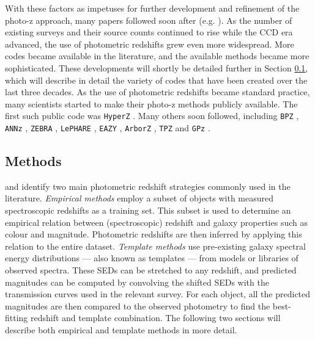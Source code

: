     
With these factors as impetuses for further development and refinement of the photo-z approach, many papers followed soon after (e.g. \citealt{1995AJ....110.2655C,1997ApJ...482L..21B,1998AJ....116.2081W,1996Natur.381..759L,1996ApJ...468L..77G,1996A&A...314...73P}). As the number of existing surveys and their source counts continued to rise while the CCD era advanced, the use of photometric redshifts grew even more widespread. More codes became available in the literature, and the available methods became more sophisticated. These developments will shortly be detailed further in Section \ref{subsection:methods}, which will describe in detail the variety of codes that have been created over the last three decades.  As the use of photometric redshifts became standard practice, many scientists started to make their photo-z methods publicly available. The first such public code was \texttt{HyperZ} \citep{2000A&A...363..476B}. Many others soon followed, including \texttt{BPZ} \citep{2000ApJ...536..571B},  \texttt{ANNz} \citep{2004PASP..116..345C},  \texttt{ZEBRA} \citep{2006MNRAS.372..565F},  \texttt{LePHARE} \citep{2006A&A...457..841I,2011ascl.soft08009A}, \texttt{EAZY} \citep{2008ApJ...686.1503B}, \texttt{ArborZ} \citep{2010ApJ...715..823G}, \texttt{TPZ} \citep{2013MNRAS.432.1483C,2010ApJ...712..511C} and \texttt{GPz} \citep{2016MNRAS.462..726A}. \par 


\subsection{Methods}\label{subsection:methods}
\cite{2011Ap&SS.331....1W} and \cite{1998astro.ph..9347Y} identify two main photometric redshift strategies commonly used in the literature. \textit{Empirical methods} employ a subset of objects with measured spectroscopic redshifts as a training set. This subset is used to determine an empirical relation between (spectroscopic) redshift and galaxy properties such as colour and magnitude. Photometric redshifts are then inferred by applying this relation to the entire dataset. \textit{Template methods} use pre-existing galaxy spectral energy distributions --- also known as templates --- from models or libraries of observed spectra. These SEDs can be stretched to any redshift, and predicted magnitudes can be computed by convolving the shifted SEDs with the transmission curves used in the relevant survey. For each object, all the predicted magnitudes are then compared to the observed photometry to find the best-fitting redshift and template combination. The following two sections will describe both empirical and template methods in more detail. \par 


